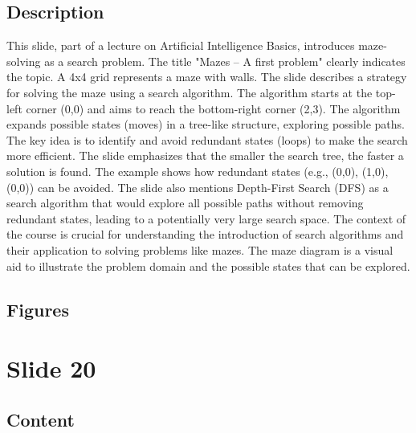 \documentclass{article}%
\begin{document}
\subsection{Description}%
This slide, part of a lecture on Artificial Intelligence Basics, introduces maze-solving as a search problem.  The title "Mazes – A first problem" clearly indicates the topic.  A 4x4 grid represents a maze with walls.  The slide describes a strategy for solving the maze using a search algorithm.  The algorithm starts at the top-left corner (0,0) and aims to reach the bottom-right corner (2,3).  The algorithm expands possible states (moves) in a tree-like structure, exploring possible paths.  The key idea is to identify and avoid redundant states (loops) to make the search more efficient.  The slide emphasizes that the smaller the search tree, the faster a solution is found.  The example shows how redundant states (e.g., (0,0), (1,0), (0,0)) can be avoided.  The slide also mentions Depth-First Search (DFS) as a search algorithm that would explore all possible paths without removing redundant states, leading to a potentially very large search space.  The context of the course is crucial for understanding the introduction of search algorithms and their application to solving problems like mazes. The maze diagram is a visual aid to illustrate the problem domain and the possible states that can be explored.%
\subsection{Figures}%
\begin{figure}[H]%
\centering%
\end{figure}

%
\newpage%
\section{Slide 20}%
\label{sec:Slide20}%
\subsection{Content}%
\end{document}
